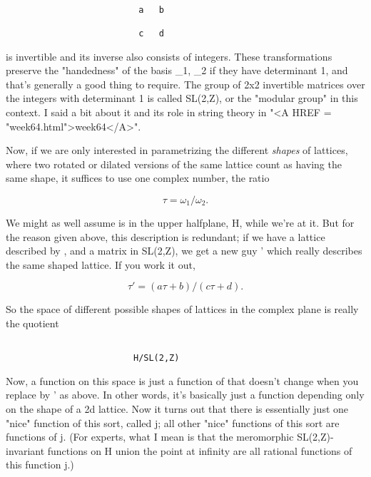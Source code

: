 \begin{verbatim}

                          a   b 

                          c   d
\end{verbatim}
    

is invertible and its inverse also consists of integers.
These transformations preserve the "handedness" of the
basis \omega _{1}, \omega _{2} 
if they have determinant 1, and that's generally
a good thing to require.  The group of 2x2 invertible matrices over the
integers with determinant 1 is called SL(2,Z), or the "modular group" in
this context.  I said a bit about it and its role in string theory in
"<A HREF = "week64.html">week64</A>".

Now, if we are only interested in parametrizing the different \emph{shapes}
of lattices, where two rotated or dilated versions of the same lattice
count as having the same shape, it suffices to use one complex number, the
ratio 

$$

                       \tau  = \omega _{1}/\omega _{2}.
$$
    
We might as well assume \tau  is in the upper 
halfplane, H, while we're at it.    But for the reason given above, this 
description is redundant; if we have a lattice described by \tau , and a 
matrix in SL(2,Z), we get a new guy \tau ' which really describes the 
same shaped lattice.  If you work it out, 

$$

                   \tau ' = (a \tau  + b)/(c \tau  + d).
$$
    
So the space of different possible shapes of lattices in the complex
plane is really the quotient 


\begin{verbatim}

                         H/SL(2,Z)
\end{verbatim}
    

Now, a function on this space is just a function of \tau  that doesn't
change when you replace \tau  by \tau ' as above.  In other words, it's
basically just a function depending only on the shape of a 2d lattice.
Now it turns out that there is essentially just one "nice" function of
this sort, called j; all other "nice" functions of this sort are
functions of j.  (For experts, what I mean is that the meromorphic
SL(2,Z)-invariant functions on H union the point at infinity are all
rational functions of this function j.)

